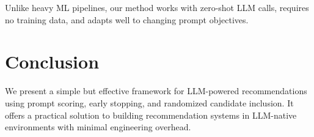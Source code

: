 \documentclass[11pt]{article}
\begin{document}
Unlike heavy ML pipelines, our method works with zero-shot LLM calls, requires no training data, and adapts well to changing prompt objectives.

\section{Conclusion}
We present a simple but effective framework for LLM-powered recommendations using prompt scoring, early stopping, and randomized candidate inclusion. It offers a practical solution to building recommendation systems in LLM-native environments with minimal engineering overhead.
\end{document}
